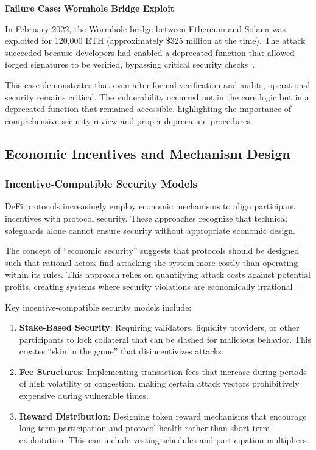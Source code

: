 \documentclass[conference]{IEEEtran}
\begin{document}
    \textbf{Failure Case: Wormhole Bridge Exploit}

    In February 2022, the Wormhole bridge between Ethereum and Solana was exploited for 120,000 ETH (approximately \$325 million at the time). The attack succeeded because developers had enabled a deprecated function that allowed forged signatures to be verified, bypassing critical security checks~\cite{wu2025exploring}.

    This case demonstrates that even after formal verification and audits, operational security remains critical. The vulnerability occurred not in the core logic but in a deprecated function that remained accessible, highlighting the importance of comprehensive security review and proper deprecation procedures.

\subsection{Economic Incentives and Mechanism Design}
    \subsubsection{Incentive-Compatible Security Models}
    DeFi protocols increasingly employ economic mechanisms to align participant incentives with protocol security. These approaches recognize that technical safeguards alone cannot ensure security without appropriate economic design.

    The concept of ``economic security'' suggests that protocols should be designed such that rational actors find attacking the system more costly than operating within its rules. This approach relies on quantifying attack costs against potential profits, creating systems where security violations are economically irrational~\cite{aspembitova2023oracles}.

    Key incentive-compatible security models include:
    \begin{enumerate}
        \item \textbf{Stake-Based Security}: Requiring validators, liquidity providers, or other participants to lock collateral that can be slashed for malicious behavior. This creates ``skin in the game'' that disincentivizes attacks.
        
        \item \textbf{Fee Structures}: Implementing transaction fees that increase during periods of high volatility or congestion, making certain attack vectors prohibitively expensive during vulnerable times.
        
        \item \textbf{Reward Distribution}: Designing token reward mechanisms that encourage long-term participation and protocol health rather than short-term exploitation. This can include vesting schedules and participation multipliers.
    \end{enumerate}
\end{document}
